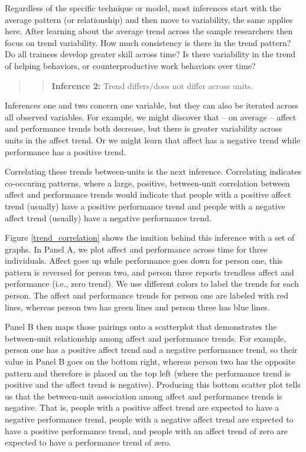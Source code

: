 \documentclass[english,,man]{apa6}
\begin{document}
Regardless of the specific technique or model, most inferences start with the average pattern (or relationship) and then move to variability, the same applies here. After learning about the average trend across the sample researchers then focus on trend variability. How much consistency is there in the trend pattern? Do all trainees develop greater skill across time? Is there variability in the trend of helping behaviors, or counterproductive work behaviors over time?

\begin{quote}
\begin{quote}
\textbf{Inference 2:} Trend differs/does not differ across units.
\end{quote}
\end{quote}

Inferences one and two concern one variable, but they can also be iterated across all observed variables. For example, we might discover that -- on average -- affect and performance trends both decrease, but there is greater variability across units in the affect trend. Or we might learn that affect has a negative trend while performance has a positive trend.

Correlating these trends between-units is the next inference. Correlating indicates co-occuring patterns, where a large, positive, between-unit correlation between affect and performance trends would indicate that people with a positive affect trend (usually) have a positive performance trend and people with a negative affect trend (usually) have a negative performance trend.

Figure \ref{trend_correlation} shows the inuition behind this inference with a set of graphs. In Panel A, we plot affect and performance across time for three individuals. Affect goes up while performance goes down for person one, this pattern is reversed for person two, and person three reports trendless affect and performance (i.e., zero trend). We use different colors to label the trends for each person. The affect and performance trends for person one are labeled with red lines, whereas person two has green lines and person three has blue lines.

Panel B then maps those pairings onto a scatterplot that demonstrates the between-unit relationship among affect and performance trends. For example, person one has a positive affect trend and a negative performance trend, so their value in Panel B goes on the bottom right, whereas person two has the opposite pattern and therefore is placed on the top left (where the performance trend is positive and the affect trend is negative). Producing this bottom scatter plot tells us that the between-unit association among affect and performance trends is negative. That is, people with a positive affect trend are expected to have a negative performance trend, people with a negative affect trend are expected to have a positive performance trend, and people with an affect trend of zero are expected to have a performance trend of zero.
\end{document}
